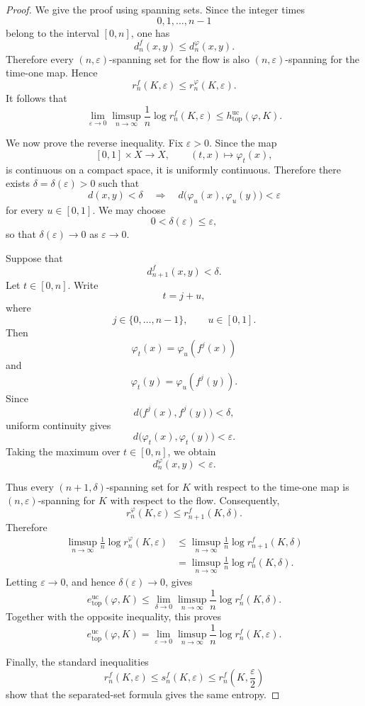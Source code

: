 \documentclass[10pt,a4paper]{amsart}
\newcommand{\hE}{e^{\mathrm{uc}}_{\mathrm{top}}}
\newcommand{\huc}{h^{\mathrm{uc}}_{\mathrm{top}}}
\begin{document}
\begin{proof}
We give the proof using spanning sets.
Since the integer times
\[
0,1,\ldots,n-1
\]
belong to the interval $[0,n]$, one has
\[
d_n^f(x,y)\leq d_n^\varphi(x,y).
\]
Therefore every $(n,\varepsilon)$-spanning set for the flow is also
$(n,\varepsilon)$-spanning for the time-one map. Hence
\[
r_n^f(K,\varepsilon)
\leq
r_n^\varphi(K,\varepsilon).
\]
It follows that
\[
\lim_{\varepsilon\to0}
\limsup_{n\to\infty}
\frac1n\log r_n^f(K,\varepsilon)
\leq
\huc(\varphi,K).
\]

We now prove the reverse inequality. Fix $\varepsilon>0$. Since the
map
\[
[0,1]\times X\longrightarrow X,
\qquad
(t,x)\longmapsto\varphi_t(x),
\]
is continuous on a compact space, it is uniformly continuous.
Therefore there exists $\delta=\delta(\varepsilon)>0$ such that
\[
d(x,y)<\delta
\quad\Longrightarrow\quad
d\bigl(\varphi_u(x),\varphi_u(y)\bigr)<\varepsilon
\]
for every $u\in[0,1]$. We may choose
\[
0<\delta(\varepsilon)\leq\varepsilon,
\]
so that $\delta(\varepsilon)\to0$ as $\varepsilon\to0$.

Suppose that
\[
d_{n+1}^f(x,y)<\delta.
\]
Let $t\in[0,n]$. Write
\[
t=j+u,
\]
where
\[
j\in\{0,\ldots,n-1\},
\qquad
u\in[0,1].
\]
Then
\[
\varphi_t(x)=\varphi_u(f^j(x))
\]
and
\[
\varphi_t(y)=\varphi_u(f^j(y)).
\]
Since
\[
d\bigl(f^j(x),f^j(y)\bigr)<\delta,
\]
uniform continuity gives
\[
d\bigl(\varphi_t(x),\varphi_t(y)\bigr)<\varepsilon.
\]
Taking the maximum over $t\in[0,n]$, we obtain
\[
d_n^\varphi(x,y)<\varepsilon.
\]

Thus every $(n+1,\delta)$-spanning set for $K$ with respect to the
time-one map is $(n,\varepsilon)$-spanning for $K$ with respect to the
flow. Consequently,
\[
r_n^\varphi(K,\varepsilon)
\leq
r_{n+1}^f(K,\delta).
\]
Therefore
\[
\begin{aligned}
\limsup_{n\to\infty}
\frac1n\log r_n^\varphi(K,\varepsilon)
&\leq
\limsup_{n\to\infty}
\frac1n\log r_{n+1}^f(K,\delta)\\
&=
\limsup_{n\to\infty}
\frac1n\log r_n^f(K,\delta).
\end{aligned}
\]
Letting $\varepsilon\to0$, and hence
$\delta(\varepsilon)\to0$, gives
\[
\hE(\varphi,K)
\leq
\lim_{\delta\to0}
\limsup_{n\to\infty}
\frac1n\log r_n^f(K,\delta).
\]
Together with the opposite inequality, this proves
\[
\hE(\varphi,K)
=
\lim_{\varepsilon\to0}
\limsup_{n\to\infty}
\frac1n\log r_n^f(K,\varepsilon).
\]

Finally, the standard inequalities
\[
r_n^f(K,\varepsilon)
\leq
s_n^f(K,\varepsilon)
\leq
r_n^f\left(K,\frac{\varepsilon}{2}\right)
\]
show that the separated-set formula gives the same entropy.
\end{proof}
\end{document}

